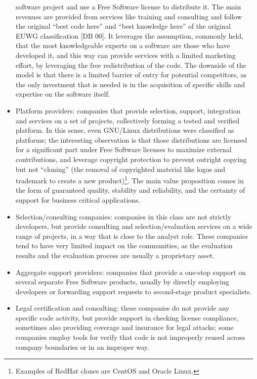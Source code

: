 \begin{itemize}
software project and use a Free Software license to distribute it. The main
revenues are provided from services like training and consulting and follow the original ``best code here'' and ``best knowledge here'' of the original EUWG classification [DB 00]. It leverages the assumption, commonly held, that the most knowledgeable experts on a software are those who have developed it, and this way can provide services with a limited marketing effort, by leveraging the free redistribution of the code. The downside of the model is that there is a limited barrier of entry for potential competitors, as the only investment that is needed is in the acquisition of specific skills and expertise on the software itself.
 \item Platform providers: companies that provide selection, support,
integration and services on a set of projects, collectively forming a tested and
verified platform. In this sense, even GNU/Linux distributions were classified
as platforms; the interesting observation is that those distributions are
licensed for a significant part under Free Software licenses to maximize
external contributions, and leverage copyright protection to prevent outright
copying but not ``cloning'' (the removal of copyrighted material like logos and
trademark to create a new product)\footnote{Examples of RedHat clones are CentOS
and Oracle Linux.}. The main value proposition comes in the
form of guaranteed quality, stability and reliability, and the certainty of
support for business critical applications.
 \item Selection/consulting companies: companies in this class are not strictly
developers, but provide consulting and selection/evaluation services on a wide
range of projects, in a way that is close to the analyst role. These companies
tend to have very limited impact on the communities, as the
evaluation results and the evaluation process are usually a proprietary asset.
 \item Aggregate support providers: companies that provide a one-stop support on
several separate Free Software products, usually by directly employing
developers or forwarding support requests to second-stage product specialists.
 \item Legal certification and consulting: these companies do not provide any
specific code activity, but provide support in checking license compliance,
sometimes also providing coverage and insurance for legal attacks; some
companies employ tools for verify that code is not improperly reused across
company boundaries or in an improper way.

\end{itemize}
